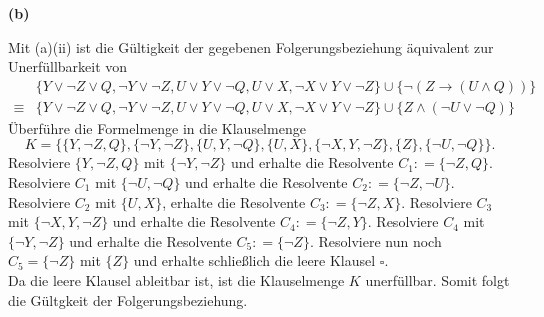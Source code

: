 \documentclass[11pt, a4paper]{article}
\newcommand{\defgr}{\mathrel{\mathop:\!\!=}}
\begin{document}
\textbf{(b)}
\begin{adjustwidth}{20pt}{20pt}
Mit (a)(ii) ist die Gültigkeit der gegebenen Folgerungsbeziehung äquivalent zur Unerfüllbarkeit von 
\begin{align*}
	& \{ Y \vee \neg Z \vee Q, \neg Y \vee \neg Z, U \vee Y \vee \neg Q, U \vee X, \neg X \vee Y \vee \neg Z\} \cup \{ \neg (Z \rightarrow (U \wedge Q))\}\\
	\equiv & \{ Y \vee \neg Z \vee Q, \neg Y \vee \neg Z, U \vee Y \vee \neg Q, U \vee X, \neg X \vee Y \vee \neg Z\} \cup \{ Z \wedge (\neg U \vee \neg Q)\}
\end{align*}
Überführe die Formelmenge in die Klauselmenge
\[
	K=\{ \{ Y, \neg Z, Q\}, \{ \neg Y, \neg Z\}, \{ U, Y, \neg Q\}, \{ U, X\}, \{\neg X, Y, \neg Z\}, \{ Z\}, \{ \neg U, \neg Q\} \}.
\]
Resolviere $\{ Y, \neg Z, Q\}$ mit $\{ \neg Y, \neg Z\}$ und erhalte die Resolvente $C_1\defgr\{\neg Z, Q\}$. Resolviere $C_1$ mit $\{ \neg U, \neg Q\}$ und erhalte die
Resolvente $C_2\defgr\{\neg Z, \neg U\}$. Resolviere $C_2$ mit $\{ U, X\}$, erhalte die Resolvente $C_3\defgr \{\neg Z, X\}$. Resolviere $C_3$ mit $\{\neg X, Y, \neg Z\}$ und
erhalte die Resolvente $C_4\defgr \{\neg Z, Y\}$. Resolviere $C_4$ mit $\{ \neg Y, \neg Z\}$ und erhalte die Resolvente $C_5\defgr \{ \neg Z\}$. Resolviere nun noch $C_5 = \{ \neg Z\}$
mit $\{ Z\}$ und erhalte schließlich die leere Klausel $\square$.\\
Da die leere Klausel ableitbar ist, ist die Klauselmenge $K$ unerfüllbar. Somit folgt die Gültgkeit der Folgerungsbeziehung.
\end{adjustwidth}
\end{document}
